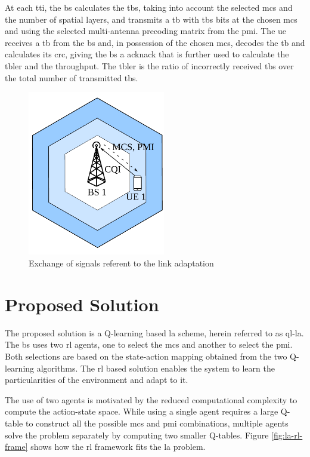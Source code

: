 At each \gls{tti}, the \gls{bs} calculates the \gls{tbs}, taking into account the selected \gls{mcs} and the number of spatial layers, and transmits a \gls{tb} with \gls{tbs} bits at the chosen \gls{mcs} and using the selected multi-antenna precoding matrix from the \gls{pmi}.
%
The \gls{ue} receives a \gls{tb} from the \gls{bs} and, in possession of the chosen \gls{mcs}, decodes the \gls{tb} and calculates its \gls{crc}, giving the \gls{bs} a \gls{acknack} that is further used to calculate the \gls{tbler} and the throughput.
%
The \gls{tbler} is the ratio of incorrectly received \gls{tb}s over the total number of transmitted \gls{tb}s.

\begin{figure}[!htb]
	\centerline{\includegraphics[width=60mm]{figures/chp_la/system-model-mateus.pdf}}
	\caption{Exchange of signals referent to the link adaptation}
	\label{fig:la-system-model}
\end{figure}


\section{Proposed Solution}
\label{sec:la-proposed}

The proposed solution is a Q-learning based \gls{la} scheme, herein referred to as \gls{ql-la}.
%
The \gls{bs} uses two \gls{rl} agents, one to select the \gls{mcs} and another to select the \gls{pmi}.
%
Both selections are based on the state-action mapping obtained from the two Q-learning algorithms.
%
The \gls{rl} based solution enables the system to learn the particularities of the environment and adapt to it.


The use of two agents is motivated by the reduced computational complexity to compute the action-state space.
%
While using a single agent requires a large Q-table to construct all the possible \gls{mcs} and \gls{pmi} combinations, multiple agents solve the problem separately by computing two smaller Q-tables.
%
Figure \ref{fig:la-rl-frame} shows how the \gls{rl} framework fits the \gls{la} problem.

